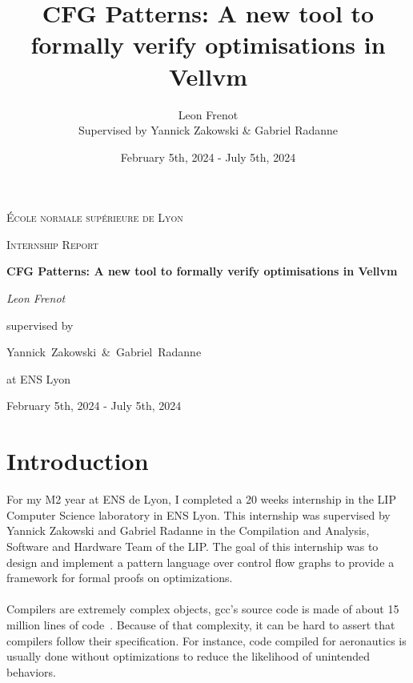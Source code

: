 \documentclass[11pt]{article}
\begin{document}
\title{CFG Patterns: A new tool to formally verify optimisations in Vellvm}

\author{Leon Frenot\\ Supervised by Yannick Zakowski \& Gabriel Radanne}

\date{February 5th, 2024 - July 5th, 2024}

\begin{titlepage}
  \centering
  {\textsc{École normale supérieure de Lyon} \par}
  \vspace{1cm}
  {\Large \textsc{Internship Report}\par}
  \vspace{1.5cm}
  {\huge\bfseries CFG Patterns: A new tool to formally verify optimisations in Vellvm\par}
  \vspace{2cm}
  {\Large\itshape Leon Frenot\par}
  \vfill
  supervised by\par
  Yannick~Zakowski~\&~Gabriel~Radanne\par
  at ENS Lyon
  \vfill

  {\large February 5th, 2024 - July 5th, 2024\par}
\end{titlepage}

\tableofcontents
\newpage

\hypersetup{colorlinks=true, linkcolor=red}

\section{Introduction}
\label{sec:intro}

\indent
For my M2 year at ENS de Lyon, I completed a 20 weeks internship in the LIP Computer Science laboratory in ENS Lyon. This internship was supervised by Yannick Zakowski and Gabriel Radanne in the Compilation and Analysis, Software and Hardware Team of the LIP. The goal of this internship was to design and implement a pattern language over control flow graphs to provide a framework for formal proofs on optimizations.

\paragraph{}
Compilers are extremely complex objects, gcc's source code is made of about 15 million lines of code~\cite{GCC}. Because of that complexity, it can be hard to assert that compilers follow their specification. For instance, code compiled for aeronautics is usually done without optimizations to reduce the likelihood of unintended behaviors.
\end{document}
